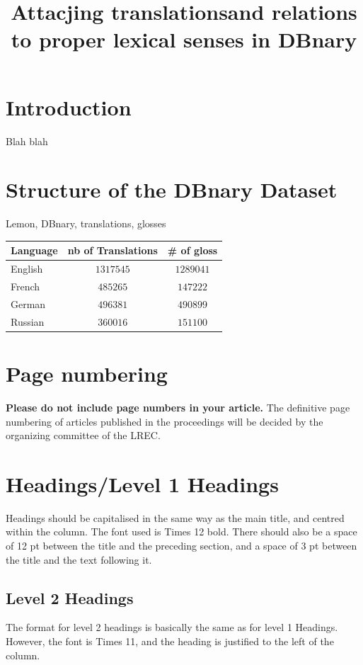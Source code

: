 \documentclass[10pt, a4paper]{article}
\title{Attacjing translationsand relations to proper lexical senses in DBnary}
\begin{document}
\maketitleabstract

\section{Introduction}
Blah blah

\section{Structure of the DBnary Dataset}

Lemon, DBnary, translations, glosses

\begin{tabular}{lcc}
\textbf{Language} & \textbf{nb of Translations} & \textbf{# of gloss}\\
\hline
English & $1317545$ & $1289041$ \\
French & $485265$ & $147222$ \\
German & $496381$ & $490899$ \\
Russian & $360016$ & $151100$ \\

\hline
\end{tabular}
\section{Page numbering}

\textbf{Please do not include page numbers in your article.} The definitive page numbering of articles published in the proceedings will be decided by the organizing committee of the LREC.

\section{Headings/Level 1 Headings}

Headings should be capitalised in the same way as the main title, and centred within the column. The font used is Times 12 bold. There should also be a space of 12 pt between the title and the preceding section, and a space of 3 pt between the title and the text following it.

\subsection{Level 2 Headings}

The format for level 2 headings is basically the same as for level 1 Headings. However, the font is Times 11, and the heading is justified to the left of the column.
\end{document}
